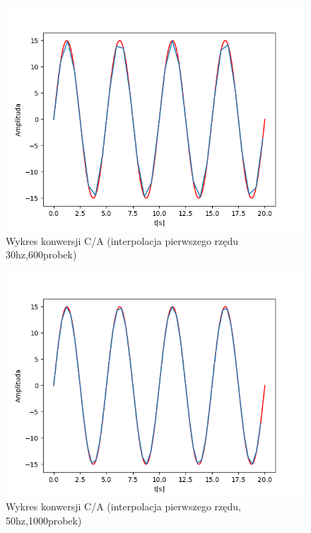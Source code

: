 \documentclass[12pt]{article}
\begin{document}
\begin{figure}[H]
\centering
\includegraphics[scale=0.6]{33sinusinterpolacja1rzedu30.png}
\caption{Wykres konwersji C/A (interpolacja pierwszego rzędu 30hz,600probek)}
\end{figure}

\begin{figure}[H]
\centering
\includegraphics[scale=0.6]{34sinusinterpolacja1rzedu50.png}
\caption{Wykres konwersji C/A (interpolacja pierwszego rzędu, 50hz,1000probek)}
\end{figure}
\end{document}

